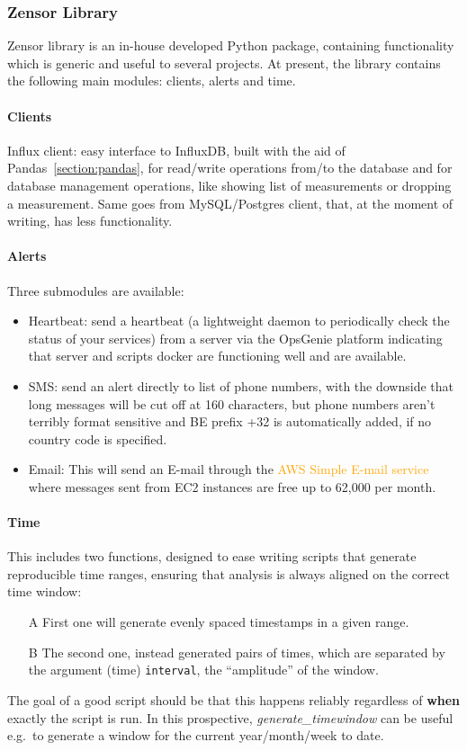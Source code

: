 \subsubsection{Zensor Library}
Zensor library is an in-house developed Python package, containing functionality which is generic and useful to several projects. At present, the library contains the following main modules: 
clients, alerts and time.
\paragraph{Clients}
Influx client: easy interface to InfluxDB, built with the aid of Pandas~\ref{section:pandas}, for read/write operations from/to the database and for database management operations, like showing list of measurements or dropping a measurement.
Same goes from MySQL/Postgres client, that, at the moment of writing, has less functionality.
\paragraph{Alerts}
Three submodules are available:
\begin{itemize}
	\item Heartbeat: send a heartbeat (a lightweight daemon to periodically check the status of your services) from a server via the OpsGenie platform indicating that server and scripts docker are functioning well and are available.
	\item SMS: send an alert directly to list of phone numbers, with the downside that long messages will be cut off at 160 characters, but phone numbers aren't terribly format sensitive 
	and BE prefix +32 is automatically added, if no country code is specified.
	\item Email: This will send an E-mail through the \textcolor{orange}{AWS Simple E-mail service} where messages sent from EC2 instances are free up to 62,000 per month.
\end{itemize}
\paragraph{Time}
This includes two functions, designed to ease writing scripts that generate reproducible time ranges, ensuring that analysis is always aligned on the correct time window:
\begin{enumerate}
	\item[A] First one will generate evenly spaced timestamps in a given range.
	\item[B] The second one, instead generated pairs of times, which are separated by the argument (time) \texttt{interval}, the ``amplitude'' of the window.
\end{enumerate}
The goal of a good script should be that this happens reliably regardless of \textbf{when} exactly the script is run.
In this prospective, \textit{generate\_timewindow} can be useful e.g.\ to generate a window for the current year/month/week to date.

